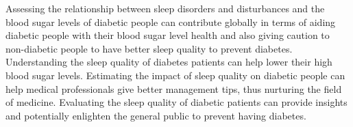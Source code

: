 Assessing the relationship between sleep disorders and disturbances and the
blood sugar levels of diabetic people can contribute globally in terms of aiding
diabetic people with their blood sugar level health and also giving caution to
non-diabetic people to have better sleep quality to prevent diabetes.
Understanding the sleep quality of diabetes patients can help lower their high
blood sugar levels. Estimating the impact of sleep quality on diabetic people
can help medical professionals give better management tips, thus nurturing the
field of medicine. Evaluating the sleep quality of diabetic patients can provide
insights and potentially enlighten the general public to prevent having
diabetes.
